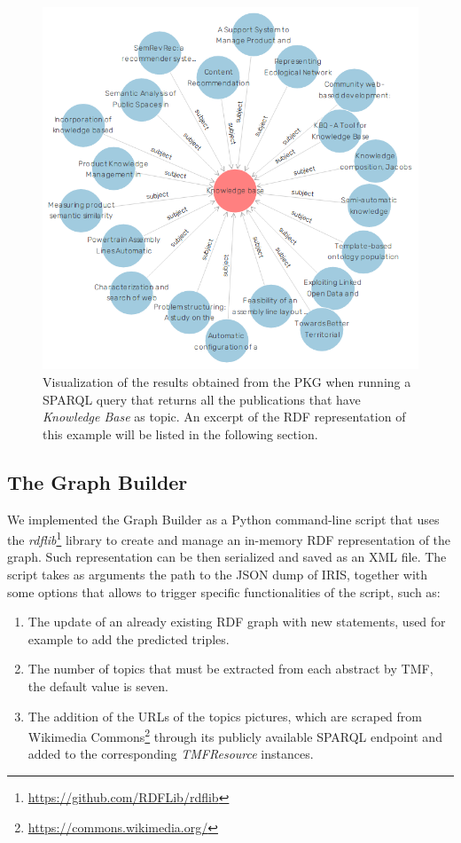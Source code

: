 \documentclass[%
    corpo=13.5pt,
    twoside,
    oldstyle,
    tipotesi=magistrale,
    greek,
    evenboxes
]{toptesi}
\begin{document}
\begin{figure}[h]
    \setlength{\belowcaptionskip}{+15pt}
    \centering
    \includegraphics[scale=0.35]{img/subject_knowledge_base.png}
    \caption{
        Visualization of the results obtained from
        the PKG when running a SPARQL query that returns
        all the publications that have \emph{Knowledge Base}
        as topic.
        An excerpt of the RDF representation of this example will be listed in
        the following section.
    }
    \label{fig:subject-knowledge-base}
\end{figure}



\subsection{The Graph Builder}

We implemented the Graph Builder as a Python command-line script that uses
the \emph{rdflib}\footnote{\url{https://github.com/RDFLib/rdflib}} library
to create and manage an in-memory RDF representation of the graph.
Such representation can be then serialized and saved as an XML file.
The script takes as arguments the path to the JSON dump of IRIS, together
with some options that allows to trigger specific functionalities of the
script, such as:

\begin{enumerate}
    \item The update of an already existing RDF graph with new statements,
        used for example to add the predicted triples.
    \item The number of topics that must be extracted from each abstract by
        TMF, the default value is seven.
    \item The addition of the URLs of
        the topics pictures, which are scraped from Wikimedia
        Commons\footnote{\url{https://commons.wikimedia.org/}} through
        its publicly available SPARQL endpoint and added
        to the corresponding \emph{TMFResource} instances.
\end{enumerate}
\end{document}
